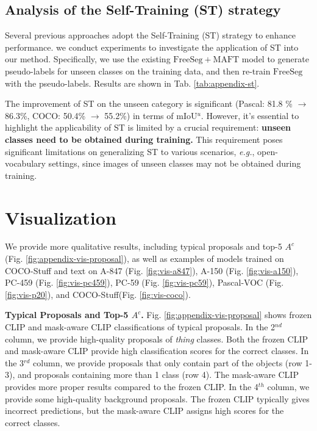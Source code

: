 \subsection{Analysis of the Self-Training (ST) strategy}


Several previous approaches \cite{STRICT, zsseg, zhou2022extract} adopt the Self-Training (ST) strategy to enhance performance. we conduct experiments to investigate the application of ST into our method. Specifically, we use the existing $\mathrm{FreeSeg+MAFT}$ model to generate pseudo-labels for unseen classes on the training data, and then re-train $\mathrm{FreeSeg}$ with the pseudo-labels.
Results are shown in Tab. \ref{tab:appendix-st}.

The improvement of ST on the unseen category is significant (Pascal: 81.8 \% $\rightarrow$ 86.3\%, COCO: 50.4\% $\rightarrow$ 55.2\%) in terms of mIoU$^u$. However, it's essential to highlight the applicability of ST is limited by a crucial requirement: \textbf{unseen classes need to be obtained during training.} This requirement poses significant limitations on generalizing ST to various scenarios, \textit{e.g.}, open-vocabulary settings, since images of unseen classes may not be obtained during training. 


\section{Visualization}
\label{sec:vis}   
 


We provide more qualitative results, including typical proposals and top-5 $A^c$ (Fig. \ref{fig:appendix-vis-proposal}), as well as examples of models trained on COCO-Stuff and text on A-847 (Fig. \ref{fig:vis-a847}), A-150 (Fig. \ref{fig:vis-a150}), PC-459 (Fig. \ref{fig:vis-pc459}), PC-59 (Fig. \ref{fig:vis-pc59}), Pascal-VOC (Fig. \ref{fig:vis-p20}), and COCO-Stuff(Fig. \ref{fig:vis-coco}).


\noindent \textbf{Typical Proposals and Top-5 $A^c$.} Fig. \ref{fig:appendix-vis-proposal} shows frozen CLIP and mask-aware CLIP classifications of typical proposals. In the 2$^{nd}$ column, we provide high-quality proposals of \textit{thing} classes. Both the frozen CLIP and mask-aware CLIP provide high classification scores for the correct classes. In the 3$^{rd}$ column, we provide proposals that only contain part of the objects (row 1-3), and proposals containing more than 1 class (row 4). The mask-aware CLIP provides more proper results compared to the frozen CLIP. In the 4$^{th}$ column, we provide some high-quality background proposals. The frozen CLIP typically gives incorrect predictions, but the mask-aware CLIP assigns high scores for the correct classes.

